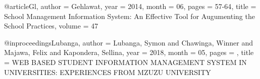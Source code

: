 @article{Gl,
    author = {Gehlawat},
    year = {2014},
    month = {06},
    pages = {57-64},
    title = {School Management Information System: An Effective Tool for Augumenting the School Practices},
    volume = {47}
}

@inproceedings{Lubanga,
    author = {Lubanga, Symon and Chawinga, Winner and Majawa, Felix and Kapondera, Sellina},
    year = {2018},
    month = {05},
    pages = {},
    title = {WEB BASED STUDENT INFORMATION MANAGEMENT SYSTEM IN UNIVERSITIES: EXPERIENCES FROM MZUZU UNIVERSITY}
}





















